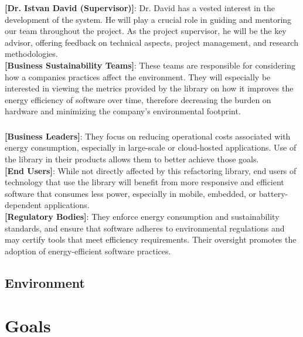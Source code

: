 \documentclass{article}
\begin{document}
\noindent
\textbf{[Dr. Istvan David (Supervisor)]}: Dr. David has a vested interest in the development of the system. He will play a crucial role in guiding and mentoring our team throughout the project. As the project supervisor, he will be the key advisor, offering feedback on technical aspects, project management, and research methodologies. \\

\noindent
\textbf{[Business Sustainability Teams]}: These teams are responsible for considering how a companies practices affect the environment. They will especially be interested in viewing the metrics provided by the library on how it improves the energy efficiency of software over time, therefore decreasing the burden on hardware and minimizing the company's environmental footprint.

\subsubsection*{\color{blue}{Indirect Stakeholders}}
\textbf{[Business Leaders]}: They focus on reducing operational costs associated with energy consumption, especially in large-scale or cloud-hosted applications. Use of the library in their products allows them to better achieve those goals. \\

\noindent
\textbf{[End Users]}: While not directly affected by this refactoring library, end users of technology that use the library will benefit from more responsive and efficient software that consumes less power, especially in mobile, embedded, or battery-dependent applications. \\

\noindent
\textbf{[Regulatory Bodies]}: They enforce energy consumption and sustainability standards, and ensure that software adheres to environmental regulations and may certify tools that meet efficiency requirements. Their oversight promotes the adoption of energy-efficient software practices.

\subsection{Environment}


\section{Goals}
\end{document}
